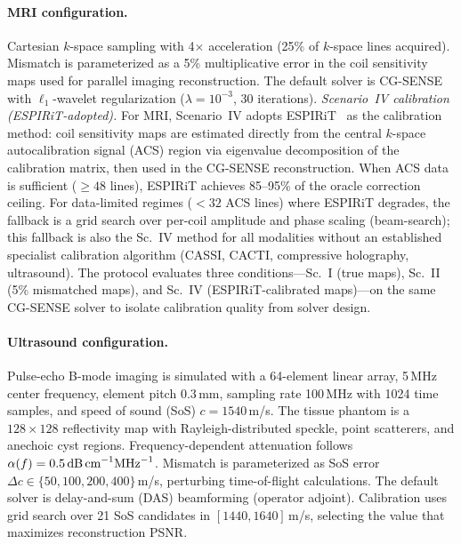 \paragraph{MRI configuration.}
Cartesian $k$-space sampling with 4$\times$ acceleration (25\% of
$k$-space lines acquired).  Mismatch is parameterized as a 5\% multiplicative
error in the coil sensitivity maps used for parallel imaging reconstruction.
The default solver is CG-SENSE~\cite{pruessmann1999sense} with $\ell_1$-wavelet regularization ($\lambda = 10^{-3}$, 30 iterations).
\textit{Scenario~IV calibration (ESPIRiT-adopted).}
For MRI, Scenario~IV adopts ESPIRiT~\cite{uecker2014espirit} as the calibration method: coil sensitivity maps are estimated directly from the central $k$-space autocalibration signal (ACS) region via eigenvalue decomposition of the calibration matrix, then used in the CG-SENSE reconstruction.  When ACS data is sufficient ($\geq 48$ lines), ESPIRiT achieves 85--95\% of the oracle correction ceiling.  For data-limited regimes ($< 32$ ACS lines) where ESPIRiT degrades, the fallback is a grid search over per-coil amplitude and phase scaling (beam-search); this fallback is also the Sc.~IV method for all modalities without an established specialist calibration algorithm (CASSI, CACTI, compressive holography, ultrasound).  The protocol evaluates three conditions---Sc.~I (true maps), Sc.~II (5\% mismatched maps), and Sc.~IV (ESPIRiT-calibrated maps)---on the same CG-SENSE solver to isolate calibration quality from solver design.

\paragraph{Ultrasound configuration.}
Pulse-echo B-mode imaging is simulated with a 64-element linear array,
5\,MHz center frequency, element pitch $0.3$\,mm, sampling rate 100\,MHz
with 1024 time samples, and speed of sound (SoS) $c = 1540$\,m/s.  The
tissue phantom is a $128 \times 128$ reflectivity map with
Rayleigh-distributed speckle, point scatterers, and anechoic cyst regions.
Frequency-dependent attenuation follows
$\alpha(f) = 0.5\,\text{dB\,cm}^{-1}\text{MHz}^{-1}$.  Mismatch is
parameterized as SoS error $\Delta c \in \{50, 100, 200, 400\}$\,m/s,
perturbing time-of-flight calculations.  The default solver is delay-and-sum
(DAS) beamforming (operator adjoint).  Calibration uses grid search over
21 SoS candidates in $[1440, 1640]$\,m/s, selecting the value that
maximizes reconstruction PSNR.

